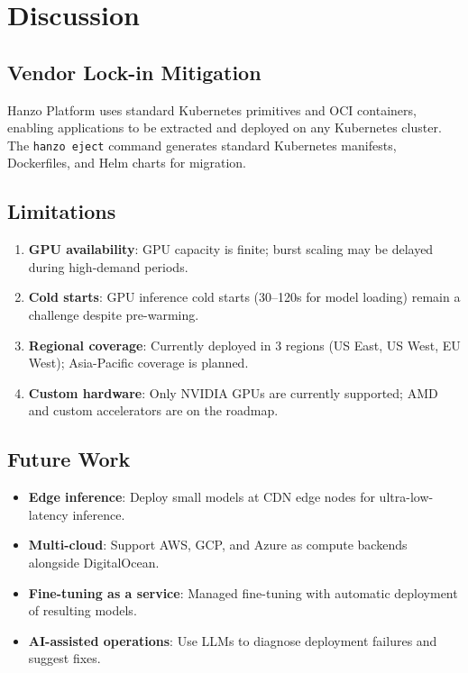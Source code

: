 \section{Discussion}

\label{sec:discussion}

\subsection{Vendor Lock-in Mitigation}

Hanzo Platform uses standard Kubernetes primitives and OCI containers, enabling applications to be extracted and deployed on any Kubernetes cluster. The \texttt{hanzo eject} command generates standard Kubernetes manifests, Dockerfiles, and Helm charts for migration.

\subsection{Limitations}

\begin{enumerate}[leftmargin=1.4em]
    \item \textbf{GPU availability}: GPU capacity is finite; burst scaling may be delayed during high-demand periods.
    \item \textbf{Cold starts}: GPU inference cold starts (30--120s for model loading) remain a challenge despite pre-warming.
    \item \textbf{Regional coverage}: Currently deployed in 3 regions (US East, US West, EU West); Asia-Pacific coverage is planned.
    \item \textbf{Custom hardware}: Only NVIDIA GPUs are currently supported; AMD and custom accelerators are on the roadmap.
\end{enumerate}

\subsection{Future Work}

\begin{itemize}[leftmargin=1.1em]
    \item \textbf{Edge inference}: Deploy small models at CDN edge nodes for ultra-low-latency inference.
    \item \textbf{Multi-cloud}: Support AWS, GCP, and Azure as compute backends alongside DigitalOcean.
    \item \textbf{Fine-tuning as a service}: Managed fine-tuning with automatic deployment of resulting models.
    \item \textbf{AI-assisted operations}: Use LLMs to diagnose deployment failures and suggest fixes.
\end{itemize}

